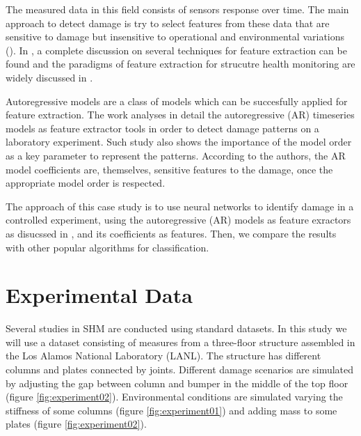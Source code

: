 \documentclass[twocolumn]{article}
\begin{document}
The measured data in this field consists of sensors response over time. The main approach to detect damage is try to select features from these data that are sensitive to damage but insensitive to operational and environmental variations (\cite{autoreg}). In \cite{report_dataset}, a complete discussion on several techniques for feature extraction can be found and the paradigms of feature extraction for strucutre health monitoring are widely discussed in \cite{axioms}.

Autoregressive models are a class of models which can be succesfully applied for feature extraction. The work \cite{autoreg} analyses in detail the autoregressive (AR) timeseries models as feature extractor tools in order to detect damage patterns on a laboratory experiment. Such study also shows the importance of the model order as a key parameter to represent the patterns. According to the authors, the AR model coefficients are, themselves, sensitive features to the damage, once the appropriate model order is respected.

The approach of this case study is to use neural networks to identify damage in a controlled experiment, using the autoregressive (AR) models as feature exractors as disucssed in \cite{autoreg}, and its coefficients as features. Then, we compare the results with other popular algorithms for classification.


\section{Experimental Data}

Several studies in SHM are conducted using standard datasets. In this study we will use a dataset consisting of measures from a three-floor structure assembled in the Los Alamos National Laboratory (LANL). The structure has different columns and plates connected by joints. Different damage scenarios are simulated by adjusting the gap between column and bumper in the middle of the top floor (figure \ref{fig:experiment02}). Environmental conditions are simulated varying the stiffness of some columns (figure \ref{fig:experiment01}) and adding mass to some plates (figure \ref{fig:experiment02}).
\end{document}
